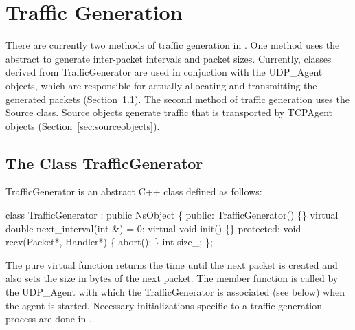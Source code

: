 




\chapter{Traffic Generation}
\label{chap:trafgen}

There are currently two methods of traffic generation in \ns.
One method uses the abstract
to generate inter-packet intervals and packet sizes.
Currently, classes derived
from TrafficGenerator are used in conjuction with the UDP\_Agent
objects, which are responsible for actually allocating and
transmitting the generated packets (Section~\ref{sec:trafgenclass}).
The second method of traffic generation uses the Source class.
Source objects generate traffic that is transported by TCPAgent objects
(Section~\ref{sec:sourceobjects}).

\section{The Class TrafficGenerator}
\label{sec:trafgenclass}

TrafficGenerator is an abstract C++ class defined as follows:
\begin{program}
        class TrafficGenerator : public NsObject \{
        public:
                TrafficGenerator() \{\}
                virtual double next_interval(int &) = 0;
                virtual void init() \{\}
        protected:
                void recv(Packet*, Handler*) \{ abort(); \}
                int size_;
        \};
\end{program}
The pure virtual function  returns the time until the
next packet is created and also sets the size in bytes of the next
packet.
The member function  is called by the UDP\_Agent with
which the TrafficGenerator is associated (see below) when the agent is
started.
Necessary initializations specific to a traffic generation
process are done in .

